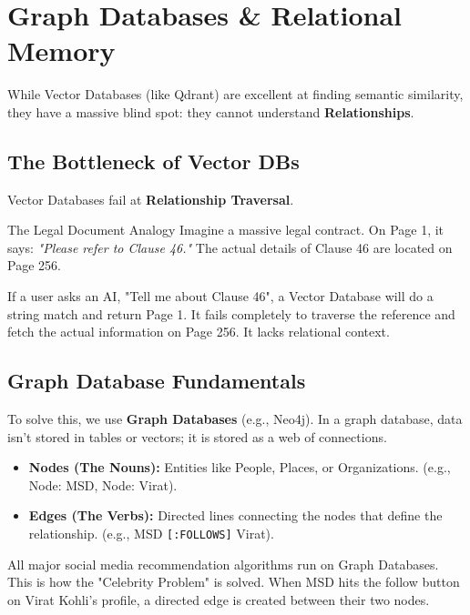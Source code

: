 \documentclass[12pt,a4paper,oneside]{book}
\begin{document}
\chapter{Graph Databases \& Relational Memory}

While Vector Databases (like Qdrant) are excellent at finding semantic similarity, they have a massive blind spot: they cannot understand \textbf{Relationships}.

\section{The Bottleneck of Vector DBs}
Vector Databases fail at \textbf{Relationship Traversal}.

\begin{concept}{The Legal Document Analogy}
	Imagine a massive legal contract. On Page 1, it says: \textit{"Please refer to Clause 46."} The actual details of Clause 46 are located on Page 256.

	If a user asks an AI, "Tell me about Clause 46", a Vector Database will do a string match and return Page 1. It fails completely to traverse the reference and fetch the actual information on Page 256. It lacks relational context.
\end{concept}

\section{Graph Database Fundamentals}
To solve this, we use \textbf{Graph Databases} (e.g., Neo4j). In a graph database, data isn't stored in tables or vectors; it is stored as a web of connections.

\begin{itemize}
	\item \textbf{Nodes (The Nouns):} Entities like People, Places, or Organizations. (e.g., Node: MSD, Node: Virat).
	\item \textbf{Edges (The Verbs):} Directed lines connecting the nodes that define the relationship. (e.g., MSD \texttt{[:FOLLOWS]} Virat).
\end{itemize}

\begin{tipbox}
	All major social media recommendation algorithms run on Graph Databases. This is how the "Celebrity Problem" is solved. When MSD hits the follow button on Virat Kohli's profile, a directed edge is created between their two nodes.
\end{tipbox}
\end{document}
